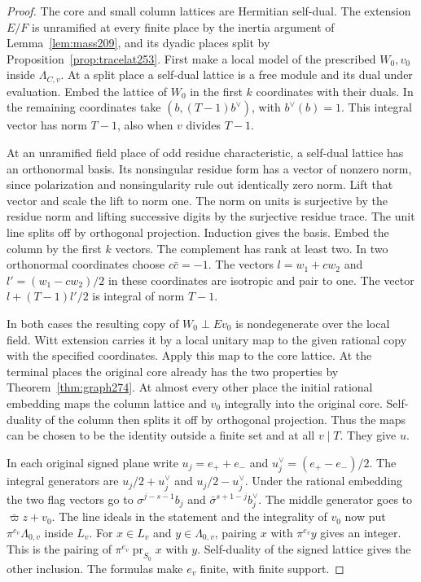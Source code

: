 \documentclass[a4paper,11pt]{article}
\theoremstyle{definition}
\theoremstyle{remark}
\numberwithin{equation}{section}
\begin{document}
\begin{proof}
The core and small column lattices are Hermitian self-dual.
The extension \(E/F\) is unramified at every finite place by
the inertia argument of Lemma~\ref{lem:mass209}, and its dyadic
places split by Proposition~\ref{prop:tracelat253}. First make
a local model of the prescribed \(W_0,v_0\) inside
\(\Lambda_{C,v}\). At a split place a self-dual lattice is
a free module and its dual under evaluation. Embed the lattice
of \(W_0\) in the first \(k\) coordinates with their duals.
In the remaining coordinates take \((b,(T-1)b^\vee)\), with
\(b^\vee(b)=1\). This integral vector has norm \(T-1\), also
when \(v\) divides \(T-1\).

At an unramified field place of odd residue characteristic,
a self-dual lattice has an orthonormal basis. Its nonsingular
residue form has a vector of nonzero norm, since polarization
and nonsingularity rule out identically zero norm. Lift that
vector and scale the lift to norm one. The norm on units is
surjective by the residue norm and lifting successive digits
by the surjective residue trace. The unit line splits off by
orthogonal projection. Induction gives the basis. Embed the
column by the first \(k\) vectors. The complement has rank at
least two. In two orthonormal coordinates choose \(c\bar c=-1\).
The vectors \(l=w_1+c w_2\) and \(l'=(w_1-c w_2)/2\) in
these coordinates are isotropic and pair to one. The vector
\(l+(T-1)l'/2\) is integral of norm \(T-1\).

In both cases the resulting copy of \(W_0\perp Ev_0\) is
nondegenerate over the local field. Witt extension carries
it by a local unitary map to the given rational copy with the
specified coordinates. Apply this map to the core lattice.
At the terminal places the original core already has the two
properties by Theorem~\ref{thm:graph274}. At almost every
other place the initial rational embedding maps the column
lattice and \(v_0\) integrally into the original core.
Self-duality of the column then splits it off by orthogonal
projection. Thus the maps can be chosen to be the identity
outside a finite set and at all \(v\mid T\). They give \(u\).

In each original signed plane write \(u_j=e_++e_-\) and
\(u_j^\vee=(e_+-e_-)/2\). The integral generators are
\(u_j/2+u_j^\vee\) and \(u_j/2-u_j^\vee\). Under the rational
embedding the two flag vectors go to
\(\sigma^{j-s-1}b_j\) and
\(\bar\sigma^{s+1-j}b_j^\vee\). The middle generator goes to
\(\bar\varpi z+v_0\). The line ideals in the statement and the
integrality of \(v_0\) now put \(\pi^{e_v}\Lambda_{0,v}\)
inside \(L_v\). For \(x\in L_v\) and \(y\in\Lambda_{0,v}\),
pairing \(x\) with \(\pi^{e_v}y\) gives an integer. This is
the pairing of \(\pi^{e_v}\operatorname{pr}_{S_0}x\) with \(y\).
Self-duality of the signed lattice gives the other inclusion.
The formulas make \(e_v\) finite, with finite support.
\end{proof}
\end{document}
